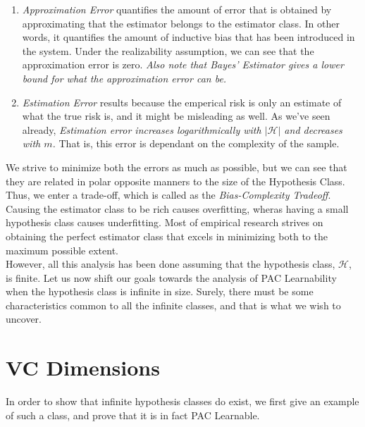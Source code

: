 \begin{enumerate}
    \item \emph{Approximation Error} quantifies the amount of error that is obtained by approximating that the estimator belongs to the estimator class. In other words, it quantifies the amount of inductive bias that has been introduced in the system. Under the realizability assumption, we can see that the approximation error is zero. \emph{Also note that Bayes' Estimator gives a lower bound for what the approximation error can be.}
    
    \item \emph{Estimation Error} results because the emperical risk is only an estimate of what the true risk is, and it might be misleading as well. As we've seen already, \emph{Estimation error increases logarithmically with $|\mathcal{H}|$ and decreases with $m$.} That is, this error is dependant on the complexity of the sample.
\end{enumerate}
\vspace{5mm}
\hspace{6mm}We strive to minimize both the errors as much as possible, but we can see that they are related in polar opposite manners to the size of the Hypothesis Class. Thus, we enter a trade-off, which is called as the \emph{Bias-Complexity Tradeoff}. Causing the estimator class to be rich causes overfitting, wheras having a small hypothesis class causes underfitting. Most of empirical research strives on obtaining the perfect estimator class that excels in minimizing both to the maximum possible extent.\\

However, all this analysis has been done assuming that the hypothesis class, $\mathcal{H}$, is finite. Let us now shift our goals towards the analysis of PAC Learnability when the hypothesis class is infinite in size. Surely, there must be some characteristics common to all the infinite classes, and that is what we wish to uncover.\\

\section{VC Dimensions}
\label{sec:infH}

In order to show that infinite hypothesis classes do exist, we first give an example of such a class, and prove that it is in fact PAC Learnable.\\

